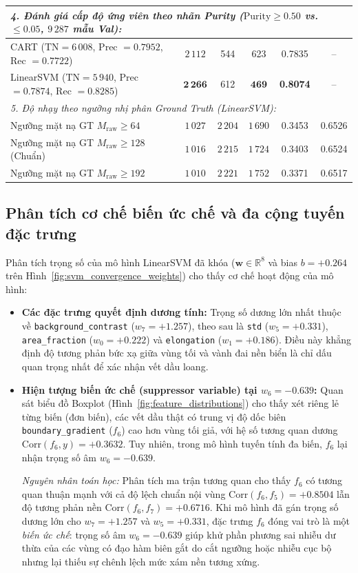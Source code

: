 \begin{table}[!htbp]
{\begin{tabular}{|l|c|c|c|c|c|}
\multicolumn{6}{|l|}{\textit{4. Đánh giá cấp độ ứng viên theo nhãn Purity ($\mathrm{Purity} \ge 0.50$ vs. $\le 0.05$, $9\,287$ mẫu Val):}} \\ \hline
CART ($\text{TN}=6\,008$, Prec $=0.7952$, Rec $=0.7722$) & $2\,112$ & 544 & 623 & 0.7835 & -- \\ \hline
LinearSVM ($\text{TN}=5\,940$, Prec $=0.7874$, Rec $=0.8285$) & $\mathbf{2\,266}$ & 612 & $\mathbf{469}$ & \textbf{0.8074} & -- \\ \hline
\multicolumn{6}{|l|}{\textit{5. Độ nhạy theo ngưỡng nhị phân Ground Truth (LinearSVM):}} \\ \hline
Ngưỡng mặt nạ GT $M_{\text{raw}} \ge 64$ & $1\,027$ & $2\,204$ & $1\,690$ & 0.3453 & 0.6526 \\ \hline
Ngưỡng mặt nạ GT $M_{\text{raw}} \ge 128$ (Chuẩn) & $1\,016$ & $2\,215$ & $1\,724$ & 0.3403 & 0.6524 \\ \hline
Ngưỡng mặt nạ GT $M_{\text{raw}} \ge 192$ & $1\,010$ & $2\,221$ & $1\,752$ & 0.3371 & 0.6517 \\ \hline
\end{tabular}%
}
\end{table}

\subsection{Phân tích cơ chế biến ức chế và đa cộng tuyến đặc trưng}

Phân tích trọng số của mô hình LinearSVM đã khóa ($\mathbf{w} \in \mathbb{R}^8$ và bias $b = +0.264$ trên Hình~\ref{fig:svm_convergence_weights}) cho thấy cơ chế hoạt động của mô hình:
\begin{itemize}
    \item \textbf{Các đặc trưng quyết định dương tính:} Trọng số dương lớn nhất thuộc về \texttt{background\_contrast} ($w_7 = +1.257$), theo sau là \texttt{std} ($w_5 = +0.331$), \texttt{area\_fraction} ($w_0 = +0.222$) và \texttt{elongation} ($w_1 = +0.186$). Điều này khẳng định độ tương phản bức xạ giữa vùng tối và vành đai nền biển là chỉ dấu quan trọng nhất để xác nhận vết dầu loang.
    \item \textbf{Hiện tượng biến ức chế (suppressor variable) tại $w_6 = -0.639$:}
    Quan sát biểu đồ Boxplot (Hình~\ref{fig:feature_distributions}) cho thấy xét riêng lẻ từng biến (đơn biến), các vết dầu thật có trung vị độ dốc biên \texttt{boundary\_gradient} ($f_6$) cao hơn vùng tối giả, với hệ số tương quan dương $\mathrm{Corr}(f_6, y) = +0.3632$. Tuy nhiên, trong mô hình tuyến tính đa biến, $f_6$ lại nhận trọng số âm $w_6 = -0.639$.
    
    \textit{Nguyên nhân toán học:} Phân tích ma trận tương quan cho thấy $f_6$ có tương quan thuận mạnh với cả độ lệch chuẩn nội vùng $\mathrm{Corr}(f_6, f_5) = +0.8504$ lẫn độ tương phản nền $\mathrm{Corr}(f_6, f_7) = +0.6716$. Khi mô hình đã gán trọng số dương lớn cho $w_7 = +1.257$ và $w_5 = +0.331$, đặc trưng $f_6$ đóng vai trò là một \textit{biến ức chế}: trọng số âm $w_6 = -0.639$ giúp khử phần phương sai nhiễu dư thừa của các vùng có đạo hàm biên gắt do cắt ngưỡng hoặc nhiễu cục bộ nhưng lại thiếu sự chênh lệch mức xám nền tương xứng.
\end{itemize}
